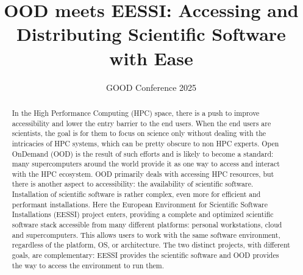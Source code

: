 \documentclass[11pt,a4paper]{article}
\title{OOD meets EESSI: Accessing and Distributing Scientific Software with Ease}
\date{GOOD Conference 2025}
\begin{document}
\maketitle

\begin{abstract}

In the High Performance Computing (HPC) space, there is a push to improve accessibility and lower the entry barrier to the end users. When the end users are scientists, the goal is for them to focus on science only without dealing with the intricacies of HPC systems, which can be pretty obscure to non HPC experts. Open OnDemand (OOD) is the result of such efforts and is likely to become a standard: many supercomputers around the world provide it as one way to access and interact with the HPC ecosystem. OOD primarily deals with accessing HPC resources, but there is another aspect to accessibility: the availability of scientific software. Installation of scientific software is rather complex, even more for efficient and performant installations. Here the European Environment for Scientific Software Installations (EESSI) project enters, providing a complete and optimized scientific software stack accessible from many different platforms: personal workstations, cloud and supercomputers. This allows users to work with the same software environment, regardless of the platform, OS, or architecture. The two distinct projects, with different goals, are complementary: EESSI provides the scientific software and OOD provides the way to access the environment to run them.

\end{abstract}
\end{document}
